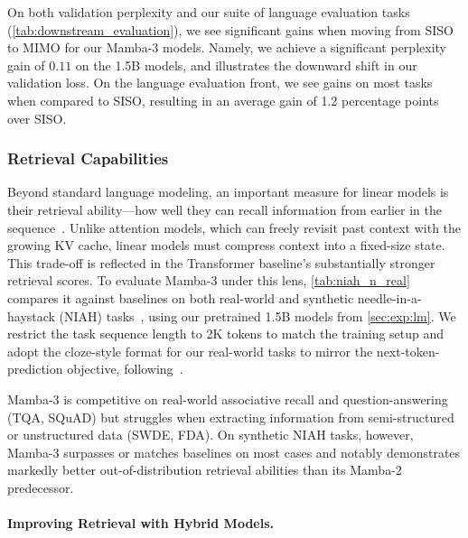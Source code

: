 On both validation perplexity and our suite of language evaluation tasks (\cref{tab:downstream_evaluation}), we see significant gains when moving from SISO to MIMO for our Mamba-3 models. Namely, we achieve a significant perplexity gain of $0.11$ on the 1.5B models, and  illustrates the downward shift in our validation loss. On the language evaluation front, we see gains on most tasks when compared to SISO, resulting in an average gain of 1.2 percentage points over SISO.

\subsubsection{Retrieval Capabilities}
\label{sec:exp:retrieval}
Beyond standard language modeling, an important measure for linear models is their retrieval ability---how well they can recall information from earlier in the sequence~\citep{arora2025mechanisticevaluationtransformersstate,arora2025simplelinearattentionlanguage}. Unlike attention models, which can freely revisit past context with the growing KV cache, linear models must compress context into a fixed-size state. This trade-off is reflected in the Transformer baseline's substantially stronger retrieval scores.  
To evaluate Mamba-3 under this lens, \cref{tab:niah_n_real} compares it against baselines on both real-world and synthetic needle-in-a-haystack (NIAH) tasks~\citep{hsieh2024rulerwhatsrealcontext}, using our pretrained 1.5B models from \cref{sec:exp:lm}. We restrict the task sequence length to 2K tokens to match the training setup and adopt the cloze-style format for our real-world tasks to mirror the next-token-prediction objective, following~\citet{arora2025simplelinearattentionlanguage,arora2024justreadtwiceclosing}.

Mamba-3 is competitive on real-world associative recall and question-answering (TQA, SQuAD) but struggles when extracting information from semi-structured or unstructured data (SWDE, FDA). On synthetic NIAH tasks, however, Mamba-3 surpasses or matches baselines on most cases and notably demonstrates markedly better out-of-distribution retrieval abilities than its Mamba-2 predecessor.

\paragraph{Improving Retrieval with Hybrid Models.}

